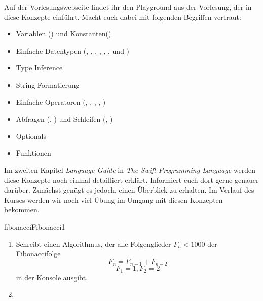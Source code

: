 \documentclass[parskip=half, final]{scrreprt}
\begin{document}
\begin{lecture}
\begin{enumerate}
	Auf der Vorlesungswebseite findet ihr den Playground aus der Vorlesung, der in diese Konzepte einführt. Macht euch dabei mit folgenden Begriffen vertraut:

	\begin{itemize}
		\item Variablen () und Konstanten()
		\item Einfache Datentypen (, , , , , ,  und )
		\item Type Inference
		\item String-Formatierung
		\item Einfache Operatoren (\swiftinline{+}, \swiftinline{-}, \swiftinline{*}, \swiftinline{/}, \swiftinline{\%})
		\item Abfragen (, ) und Schleifen (, )
		\item Optionals
		\item Funktionen
	\end{itemize}
	
	Im zweiten Kapitel \emph{Language Guide} in \emph{The Swift Programming Language} werden diese Konzepte noch einmal detailliert erklärt. Informiert euch dort gerne genauer darüber. Zunächst genügt es jedoch, einen Überblick zu erhalten. Im Verlauf des Kurses werden wir noch viel Übung im Umgang mit diesen Konzepten bekommen.
	

\end{enumerate}

\begin{exc}

\begin{excitem}{fibonacci}{Fibonacci}{1}

\begin{enumerate}
\item Schreibt einen Algorithmus, der alle Folgenglieder $F_n < 1000$ der Fibonaccifolge
\begin{equation}
F_n = F_{n-1} + F_{n-2}
\end{equation}
\begin{equation}
F_1=1, F_2=2
\end{equation}
in der Konsole ausgibt.
\item {}
\end{enumerate}


\end{excitem}
\end{exc}
\end{lecture}
\end{document}
